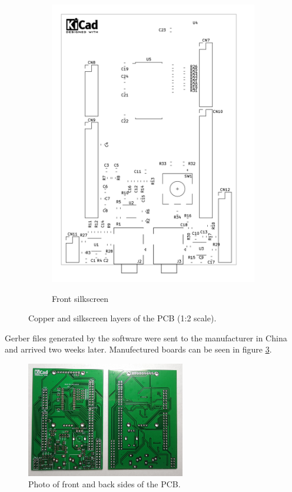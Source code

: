\documentclass[a4paper,twoside,12pt]{book}
\begin{document}
\begin{figure}[H]
\begin{subfigure}[h]{0.273\textwidth}
        \includegraphics[width=\textwidth]{images/Board_silkscreen}
        \label{fig:board3}
        \caption{Front silkscreen}
    \end{subfigure}
    \caption{Copper and silkscreen layers of the PCB (1:2 scale).}
    \label{fig:board}
\end{figure}

Gerber files generated by the software were sent to the manufacturer in China
and arrived two weeks later.
Manufectured boards can be seen in figure \ref{fig:photo_boards}.

\begin{figure}[H]
    \centering
    \includegraphics[width=0.618\textwidth]{images/photo_boards}
    \caption{Photo of front and back sides of the PCB.}
    \label{fig:photo_boards}
\end{figure}
\end{document}
